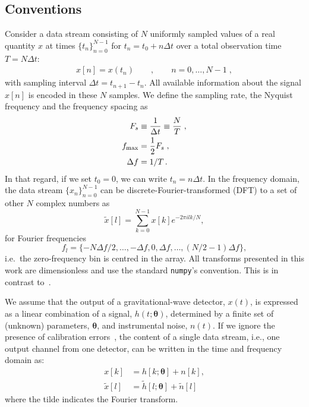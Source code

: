 \documentclass[twocolumn,preprintnumbers,
  superscriptaddress,
  nofootinbib,
  amsmath,
  amssymb,
  aps,
  prd,
  colorlinks=true,
  linkcolor=blue,
  urlcolor=blue,
  citecolor=blue,
  anchorcolor=blue
]{revtex4-2}
\begin{document}
\subsection{Conventions}\label{sec:conventions}
Consider a data stream consisting of $N$ uniformly sampled values of a real quantity $x$ at times $\{t_n\}_{n=0}^{N-1}$ for $t_n = t_0 + n\Delta t$ over a total observation time $T = N\Delta t$:
\begin{align}\label{st_definition}
  x[n]=x(t_n)\qquad,\qquad n=0,\dots,N-1\;,
\end{align}
with sampling interval $\Delta t = t_{n+1} - t_{n}$. All available information about the signal $x[n]$ is encoded in these $N$ samples. We define the sampling rate, the Nyquist frequency and the frequency spacing as
\begin{align} F_s&\equiv\frac{1}{\Delta t}\equiv\frac{N}{T}\;,\nonumber\\
f_{\rm max}&=\frac{1}{2} F_s\;,\nonumber\\
\Delta f &= 1/T\,.
\end{align}
In that regard, if we set $t_0=0$, we can write $t_n=n\Delta t$.
In the frequency domain, the data stream $\{x_n\}_{n=0}^{N-1}$ can be discrete-Fourier-transformed (DFT) to a set of other $N$ complex numbers as
\begin{equation}
  \label{eq:dft-definition}
  \tilde x[l] = \sum_{k = 0}^{N-1} x[k]e^{-2\pi i l k/N},
\end{equation}
for Fourier frequencies
\begin{equation*}
  f_{l} = \{-N\Delta f/2, \ldots, -\Delta f, 0, \Delta f, \ldots, (N/2 - 1)\Delta f\},
\end{equation*}
i.e.\ the zero-frequency bin is centred in the array. All transforms presented in this work are dimensionless and use the standard \texttt{numpy}'s convention. This is in contrast to~\cite{Cornish:2020odn}.

We assume that the output of a gravitational-wave detector, $x(t)$, is expressed as a linear combination of a signal, $h(t; \boldsymbol{\theta})$, determined by a finite set of (unknown) parameters, $\boldsymbol{\theta}$, and instrumental noise, $n(t)$. If we ignore the presence of calibration errors~\cite{Savalle_2022}, the content of a single data stream, i.e., one output channel from one detector, can be written in the time and frequency domain as:
\begin{align}
  {x}[k] & = h[k;\boldsymbol{\theta}] + n[k],\\
  \tilde x[l]& = \tilde{h}[l;\boldsymbol{\theta}]+ \tilde{n}[l]
\end{align}
where the tilde indicates the Fourier transform.
\end{document}
